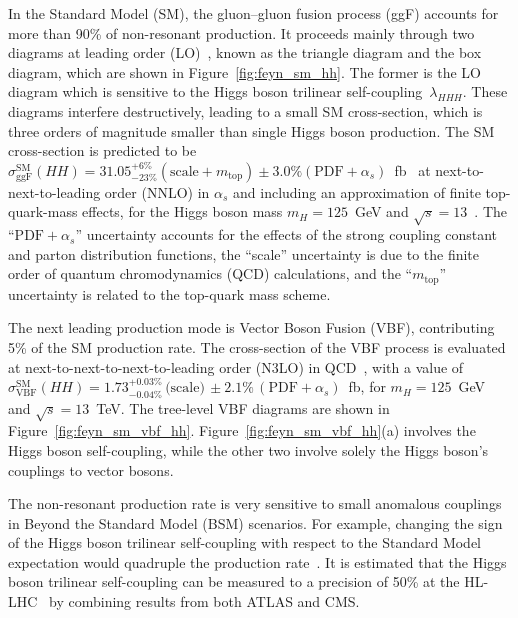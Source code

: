 \documentclass[twoside,11pt]{report}
\begin{document}
In the Standard Model (SM), the gluon--gluon fusion process (ggF) 
accounts for more than 90\% of non-resonant \HH production. It proceeds mainly through two diagrams at leading order (LO)~\cite{Glover:183945}, known as the triangle diagram and the box diagram, which are shown in Figure~\ref{fig:feyn_sm_hh}. The former is the LO diagram which is sensitive to the Higgs boson trilinear self-coupling~$\lambda_{HHH}$. These diagrams interfere destructively, leading to a small SM \HH cross-section, which is three orders of magnitude smaller than single Higgs boson production.
The SM \HH cross-section is predicted to be $\sigma_{\textrm{ggF}}^\textrm{SM}(HH) = 31.05^{+6\%}_{-23\%} (\textrm{scale} + m_{\textrm{top}}) \pm{3.0\%} (\textrm{PDF}+\alpha_{s})$~fb~\cite{Dawson_1998,Borowka:2016ehy,Baglio_2019,de_Florian_2013,Shao_2013,deflorian2015higgs,Grazzini_2018,Baglio_2021} at next-to-next-to-leading order (NNLO) in $\alpha_s$ and including an approximation of finite top-quark-mass effects, for the Higgs boson mass $m_H=125$~GeV and $\sqrt{s}=13$~\TeV. 
The ``$\textrm{PDF}+\alpha_{s}$'' uncertainty accounts for the effects of the strong coupling constant and parton distribution functions, the ``scale'' uncertainty is due to the finite order of quantum chromodynamics (QCD) calculations, and the  ``$m_{\textrm{top}}$'' uncertainty is related to the top-quark mass scheme.

The next leading \HH production mode is Vector Boson Fusion (VBF), contributing 5\% of the SM \HH production rate. The cross-section of the VBF \HH process is evaluated at next-to-next-to-next-to-leading order (N3LO) in QCD~\cite{Baglio_2013,Frederix_2014,Liu-Sheng:2014gxa,Dreyer:2018qbw,Dreyer:2018rfu}, with a value of $\sigma_{\mathrm{VBF}}^\textrm{SM}(HH) = 1.73^{+0.03\%}_{-0.04\%}\,\text{(scale)}\,\pm 2.1\%\,(\textrm{PDF}+\alpha_{s})$~fb, for $m_H=125$~GeV and $\sqrt{s}=13$~TeV. The tree-level VBF \HH diagrams are shown in Figure~\ref{fig:feyn_sm_vbf_hh}. Figure~\ref{fig:feyn_sm_vbf_hh}(a) involves the Higgs boson self-coupling, while the other two involve solely the Higgs boson's couplings to vector bosons.


The non-resonant \HH production rate is very sensitive to small anomalous couplings in Beyond the Standard Model (BSM) scenarios. For example, changing the sign of the Higgs boson trilinear self-coupling with respect to the Standard Model expectation would quadruple the \HH production rate~\cite{Baglio_2013}. It is estimated that the Higgs boson trilinear self-coupling can be measured to a precision of 50\% at the HL-LHC~\cite{Cepeda:2019klc} by combining results from both ATLAS and CMS. 
\end{document}
